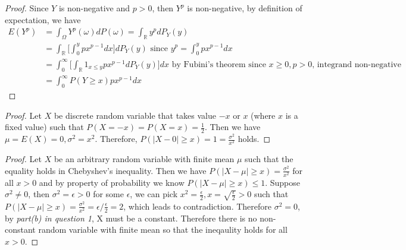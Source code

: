 \documentclass[10pt]{article}
\newenvironment{problem}[2][Problem]{\begin{trivlist}
\item[\hskip \labelsep {\bfseries #1}\hskip \labelsep {\bfseries #2.}]}{\end{trivlist}}
\begin{document}
\begin{proof}
Since $Y$ is non-negative and $p>0$, then $Y^p$ is non-negative, by definition of expectation, we have 
\begin{equation}
\begin{split}
E(Y^p) &= \int_{\Omega}Y^p(\omega)dP(\omega) = \int_{\mathbb{R}}y^pdP_{Y}(y) \\
&= \int_{\mathbb{R}} \big[\int_{0}^{y} px^{p-1}dx\big]dP_{Y}(y) \text{ since } y^p = \int_{0}^{y} px^{p-1}dx\\ 
&= \int_{0}^{\infty} \big[\int_{\mathbb{R}} 1_{x\le y}px^{p-1}dP_{Y}(y)\big]dx \text{ by Fubini's theorem since } x\ge0,p > 0 \text{, integrand non-negative}\\
&= \int_{0}^{\infty} P(Y \ge x)px^{p-1}dx
\end{split}
\end{equation}
\end{proof}

\begin{problem}{3(a)}
\end{problem}
 
\begin{proof}
Let $X$ be discrete random variable that takes value $-x$ or $x$ (where $x$ is a fixed value) such that $P(X = -x) = P(X = x) = \frac{1}{2}$. Then we have $\mu = E(X) = 0, \sigma^2 = x^2$. Therefore, $P(|X-0|\ge x) = 1 = \frac{\sigma^2}{x^2}$ holds.
\end{proof}

\begin{problem}{3(b)}
\end{problem}
 
\begin{proof}
Let $X$ be an arbitrary random variable with finite mean $\mu$ such that the equality holds in Chebyshev's inequality. Then we have $P(|X-\mu| \ge x) = \frac{\sigma^2}{x^2}$ for all $x>0$ and by property of probability we know $P(|X-\mu| \ge x) \le 1$. Suppose $\sigma^2 \neq 0$, then $\sigma^2 = \epsilon > 0$ for some $\epsilon$, we can pick $x^2 = \frac{\epsilon}{2}, x = \sqrt{\frac{\epsilon}{2}} > 0$ such that $P(|X-\mu| \ge x) = \frac{\sigma^2}{x^2} = \epsilon/\frac{\epsilon}{2} = 2$, which leads to contradiction. Therefore $\sigma^2 =0$, by \textit{part(b) in question 1}, X must be a constant. Therefore there is no non-constant random variable with finite mean so that the ineqaulity holds for all $x>0$.
\end{proof}


\begin{problem}{4}
\end{problem}
 
\end{document}

